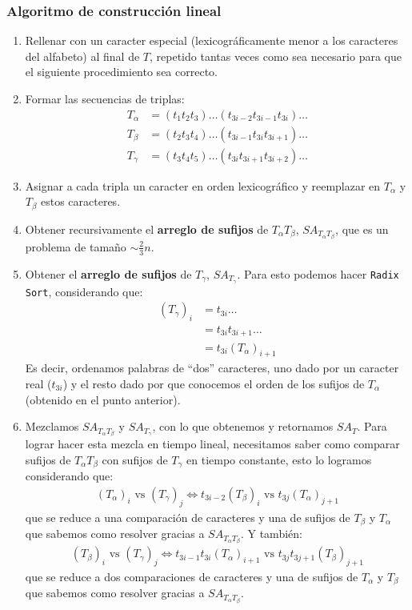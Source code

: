 \documentclass[dcc,uchile]{fcfmcourse}
\begin{document}
\subsubsection*{Algoritmo de construcción lineal}
\begin{enumerate}
\item Rellenar con un caracter especial (lexicográficamente menor a los caracteres del alfabeto) al final de $T$, repetido tantas veces como sea necesario para que el siguiente procedimiento sea correcto.
\item Formar las secuencias de triplas:
\begin{align*}
T_\alpha &= (t_{1}t_{2}t_{3})\ldots (t_{3i-2}t_{3i-1}t_{3i}) \ldots \\
T_\beta &= (t_{2}t_{3}t_{4})\ldots (t_{3i-1}t_{3i}t_{3i+1}) \ldots \\
T_\gamma &= (t_{3}t_{4}t_{5})\ldots (t_{3i}t_{3i+1}t_{3i+2}) \ldots 
\end{align*}
\item Asignar a cada tripla un caracter en orden lexicográfico y reemplazar en $T_\alpha$ y $T_\beta$ estos caracteres.
\item Obtener recursivamente el \textbf{arreglo de sufijos} de $T_\alpha T_\beta$, $SA_{T_\alpha T_\beta}$, que es un problema de tamaño $\sim \frac{2}{3}n$.
\item Obtener el \textbf{arreglo de sufijos} de $T_{\gamma}$, $SA_{T_\gamma}$. Para esto podemos hacer \texttt{Radix Sort}, considerando que:
\begin{align*}
(T_{\gamma})_{i} &= t_{3i}\ldots\\
&= t_{3i}t_{3i+1}\ldots\\
&= t_{3i}(T_\alpha)_{i+1}
\end{align*}
Es decir, ordenamos palabras de ``dos'' caracteres, uno dado por un caracter real ($t_{3i}$) y el resto dado por que conocemos el orden de los sufijos de $T_\alpha$ (obtenido en el punto anterior).
\item Mezclamos $SA_{T_\alpha T_\beta}$ y $SA_{T_\gamma}$, con lo que obtenemos y retornamos $SA_T$. Para lograr hacer esta mezcla en tiempo lineal, necesitamos saber como comparar sufijos de $T_\alpha T_\beta$ con sufijos de $T_\gamma$ en tiempo constante, esto lo logramos considerando que:
\begin{align*}
(T_{\alpha})_i \text{ vs } (T_{\gamma})_j \Leftrightarrow t_{3i-2}(T_{\beta})_{i} \text{ vs } t_{3j}(T_{\alpha})_{j+1}
\end{align*}
que se reduce a una comparación de caracteres y una de sufijos de $T_\beta$ y $T_\alpha$ que sabemos como resolver gracias a $SA_{T_\alpha T_\beta}$. Y también:
\begin{align*}
(T_{\beta})_i \text{ vs } (T_{\gamma})_j \Leftrightarrow t_{3i-1}t_{3i}(T_{\alpha})_{i+1} \text{ vs } t_{3j}t_{3j+1}(T_{\beta})_{j+1}
\end{align*}
que se reduce a dos comparaciones de caracteres y una de sufijos de $T_\alpha$ y $T_\beta$ que sabemos como resolver gracias a $SA_{T_\alpha T_\beta}$.
\end{enumerate}
\end{document}
